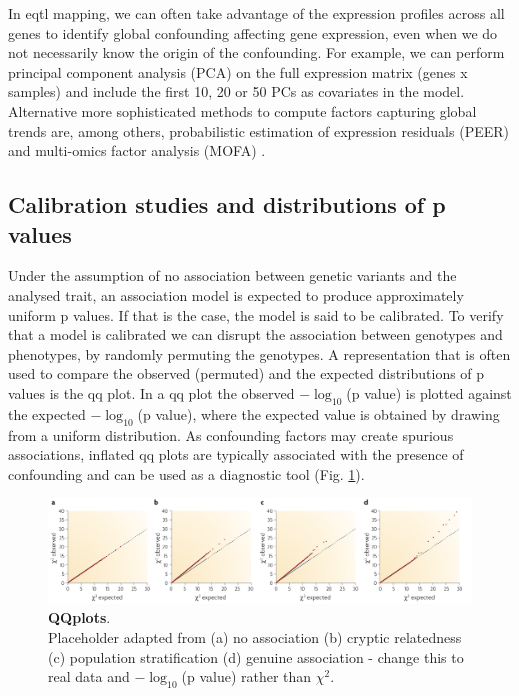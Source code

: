 In \gls{eqtl} mapping, we can often take advantage of the expression profiles across all genes to identify global confounding affecting gene expression, even when we do not necessarily know the origin of the confounding.
For example, we can perform principal component analysis (PCA) on the full expression matrix (genes x samples) and include the first 10, 20 or 50 PCs as covariates in the model.
Alternative more sophisticated methods to compute factors capturing global trends are, among others, probabilistic estimation of expression residuals (PEER) \cite{stegle2010bayesian, stegle2012using} and multi-omics factor analysis (MOFA) \cite{argelaguet2018multi}. 

\subsection{Calibration studies and distributions of p values}

Under the assumption of no association between genetic variants and the analysed trait, an association model is expected to produce approximately uniform p values.
If that is the case, the model is said to be calibrated.
To verify that a model is calibrated we can disrupt the association between genotypes and phenotypes, by randomly permuting the genotypes. 
A representation that is often used to compare the observed (permuted) and the expected distributions of p values is the \gls{qq} plot. 
In a \gls{qq} plot the observed $-\log_{10}$(p value) is plotted against the expected $-\log_{10}$(p value), where the expected value is obtained by drawing from a uniform distribution. 
As confounding factors may create spurious associations, inflated \gls{qq} plots are typically associated with the presence of confounding and can be used as a diagnostic tool (Fig. \ref{fig:qqplots}). 

\vspace{2mm}

\begin{figure}[h]
\centering
\includegraphics[width=15cm]{Chapter2/Fig/qqplots.png}
\caption[QQplots]{\textbf{QQplots}.\\
Placeholder adapted from \cite{mccarthy2008genome}
(a) no association (b) cryptic relatedness (c) population stratification (d) genuine association - change this to real data and $-\log_{10}$(p value) rather than $\chi^2$.}
\label{fig:qqplots}
\end{figure}



